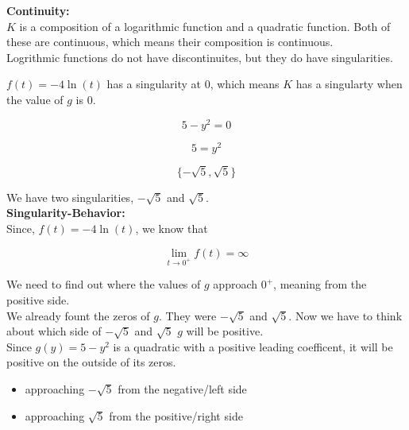 \documentclass{ximera}
\begin{document}
\textbf{\textcolor{blue!55!black}{Continuity:}} \\


$K$ is a composition of a logarithmic function and a quadratic function.  Both of these are continuous, which means their composition is continuous. \\

Logrithmic functions do not have discontinuites, but they do have singularities.  


$f(t) = -4\ln(t)$ has a singularity at $0$, which means $K$ has a singularty when the value of $g$ is $0$.



\[
5 - y^2 = 0
\]



\[
5 = y^2
\]



\[
\{ -\sqrt{5}, \sqrt{5} \}
\]

We have two singularities, $-\sqrt{5}$ and $\sqrt{5}$. \\












\textbf{\textcolor{blue!55!black}{Singularity-Behavior:}} \\



Since, $f(t) = -4 \ln(t)$, we know that 


\[
\lim\limits_{t \to 0^+} f(t) = \infty
\]



We need to find out where the values of $g$ approach $0^+$, meaning from the positive side. \\


We already fount the zeros of $g$.  They were $-\sqrt{5}$ and $\sqrt{5}$.  Now we have to think about which side of $-\sqrt{5}$ and $\sqrt{5}$ $g$ will be positive. \\


Since $g(y) = 5 - y^2$ is a quadratic with a positive leading coefficent, it will be positive on the outside of its zeros. 

\begin{itemize}
\item approaching $-\sqrt{5}$ from the negative/left side
\item approaching $\sqrt{5}$ from the positive/right side
\end{itemize}
\end{document}
